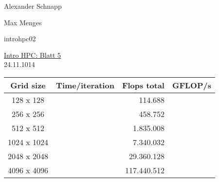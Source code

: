 \documentclass[a4paper,11pt]{scrartcl}
\begin{document}
\hfill Alexander Schnapp

\hfill Max Menges

\hfill introhpc02

\begin{center}
\underline{\Huge{Intro HPC: Blatt 5}}\\
\large{24.11.1014}\\
\end{center}



\begin{tabular}{|c|r|r|r|}
\hline 
\multicolumn{1}{|c|}{Grid size} & \multicolumn{1}{|c|}{Time/iteration} & \multicolumn{1}{|c|}{Flops total} & \multicolumn{1}{|c|}{GFLOP/s} \\
\hline
128 x 128&  &114.688 &  \\
\hline
256 x 256&  &458.752 &  \\
\hline
512 x 512&  &1.835.008 &  \\
\hline
1024 x 1024&  &7.340.032 &  \\
\hline
2048 x 2048&  & 29.360.128&  \\
\hline
4096 x 4096&  & 117.440.512&  \\
\hline
\end{tabular} 
\end{document}
